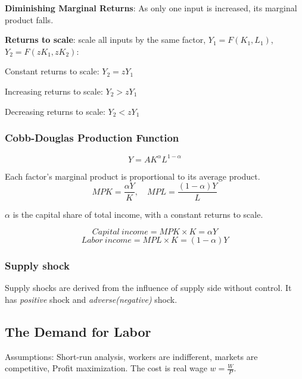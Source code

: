 \documentclass[10pt, a4paper]{article}
\begin{document}
            \textbf{Diminishing Marginal Returns}: As only one input is increased, its marginal product falls.

            \textbf{Returns to scale}: scale all inputs by the same factor, $Y_1 = F(K_1, L_1)$, $Y_2 = F(zK_1, zK_2)$: 

            {Constant returns to scale}: $Y_2 = zY_1$
            
            {Increasing returns to scale}: $Y_2 > zY_1$

            {Decreasing returns to scale}: $Y_2 < zY_1$
            
            \subsubsection{Cobb-Douglas Production Function} 
            $$Y = AK^{\alpha}L^{1 - \alpha}$$

            Each factor's marginal product is proportional to its average product. 
            $$MPK = \frac{\alpha Y}{K}, \quad MPL = \frac{(1 - \alpha) Y}{L}$$

            $\alpha$ is the capital share of total income, with a constant returns to scale.

            $$Capital\ income = MPK \times K = \alpha Y$$
            $$Labor\ income = MPL \times K = (1 - \alpha)Y$$

            \subsubsection{Supply shock}
                Supply shocks are derived from the influence of supply side without control. It has \emph{positive} shock and \emph{adverse(negative)} shock.

        \subsection{The Demand for Labor}
            Assumptions: Short-run analysis, workers are indifferent, markets are competitive, Profit maximization. The cost is real wage $w = \frac{W}{P}$.
\end{document}
